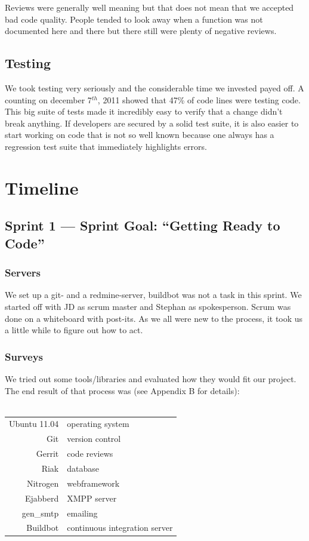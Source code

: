 \documentclass[11pt,a4paper]{report}
\begin{document}
Reviews were generally well meaning but that does not mean that we accepted bad
code quality. People tended to look away when a function was not documented here
and there but there still were plenty of negative reviews.

\subsection*{Testing}
We took testing very seriously and the considerable time we invested payed off.
A counting on december 7$^{th}$, 2011 showed that 47\% of code lines were testing
code. This big suite of tests made it incredibly easy to verify that a change
didn't break anything. If developers are secured by a solid test suite, it is
also easier to start working on code that is not so well known because one
always has a regression test suite that immediately highlights errors.

\section{Timeline}
\subsection*{Sprint 1 --- Sprint Goal: ``Getting Ready to Code''}
\subsubsection{Servers}
We set up a git- and a redmine-server, buildbot was not
a task in this sprint. We started off with JD as scrum master and Stephan as
spokesperson. Scrum was done on a whiteboard with post-its.
As we all were new to the process, it took us a little while to figure out how
to act.
\subsubsection{Surveys}
We tried out some tools/libraries and evaluated how they would fit
our project. The end result of that process was (see Appendix B for details): \\
\\
\begin{tabular}{r|l}
Ubuntu 11.04 & operating system \\
Git          & version control  \\
Gerrit       & code reviews     \\
Riak         & database         \\
Nitrogen     & webframework     \\
Ejabberd     & XMPP server      \\
gen\_smtp    & emailing         \\
Buildbot     & continuous integration server
\end{tabular}
\end{document}
